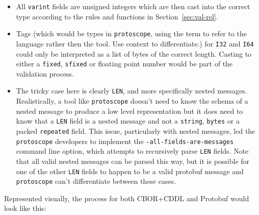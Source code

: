 \begin{itemize}
\item All \texttt{varint} fields are unsigned integers which are then cast into
  the correct type according to the rules and functions in
  Section~\ref{sec:val-rel}.
\item Tags (which would be types in \texttt{protoscope}, using the term to refer
  to the language rather then the tool. Use context to differentiate.) for
  \texttt{I32} and \texttt{I64} could only be interpreted as a list of bytes of
  the correct length. Casting to either a \texttt{fixed}, \texttt{sfixed} or
  floating point number would be part of the validation process.
\item The tricky case here is clearly \texttt{LEN}, and more specifically nested
  messages. Realistically, a tool like \texttt{protoscope} doesn't need to know
  the schema of a nested message to produce a low level representation but it
  does need to know that a \texttt{LEN} field is a nested message and not a
  \texttt{string}, \texttt{bytes} or a packed \texttt{repeated} field. This
  issue, particularly with nested messages, led the \texttt{protoscope}
  developers to implement the \texttt{-all-fields-are-messages} command line
  option, which attempts to recursively parse \texttt{LEN} fields. Note that all
  valid nested messages can be parsed this way, but it is possible for one of
  the other \texttt{LEN} fields to happen to be a valid protobuf message and
  \texttt{protoscope} can't differentiate between these cases.
\end{itemize}

Represented visually, the process for both CBOR+CDDL and Protobuf would look
like this:

